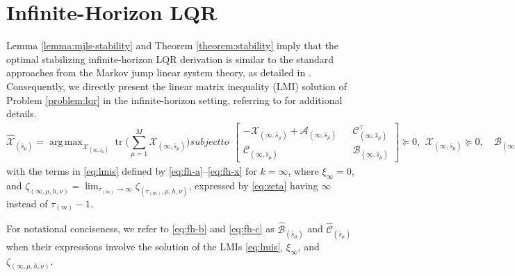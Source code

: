 \documentclass[journal,twoside,web]{ieeecolor}
\begin{document}
\section{Infinite-Horizon LQR}\label{sec:lqr-ih}
Lemma \ref{lemma:mjls-stability} and Theorem \ref{theorem:stability} imply that the optimal stabilizing infinite-horizon LQR derivation is similar to the standard approaches from the Markov jump linear system theory, as detailed in \cite{yZL-2025-automatica}. Consequently, we directly present the linear matrix inequality (LMI) solution of Problem \ref{problem:lqr} in the infinite-horizon setting, referring to \cite{yZL-2025-automatica} for additional details.
\begin{subequations}\label{eq:lmis}
\begin{equation}\label{eq:lmi-sol}
    \hat{\mathcal{X}}_{(\hat{s}_{\mu})} = \mathop{\mathrm{arg\,max}}_{\mathcal{X}_{(\infty,\hat{s}_{\mu})}} 
    \mathop{\mathrm{tr}}\bigg(\sum_{\mu=1}^{M}\mathcal{X}_{(\infty,\hat{s}_{\mu})}\bigg) 
\end{equation}
subject to
\begin{align}\label{eq:lmi-core}
    \begin{bmatrix}
        -\mathcal{X}_{(\infty,\hat{s}_{\mu})} + \mathcal{A}_{(\infty,\hat{s}_{\mu})} & & \mathcal{C}_{(\infty,\hat{s}_{\mu})}^{\top} \\
        \mathcal{C}_{(\infty,\hat{s}_{\mu})} & & \mathcal{B}_{(\infty,\hat{s}_{\mu})}
    \end{bmatrix} \succeq 0,
\end{align}
\begin{equation}\label{eq:lmi-supp}
    \mathcal{X}_{(\infty,\hat{s}_{\mu})}\succeq 0, \quad \mathcal{B}_{(\infty,\hat{s}_{\mu})} \succ 0, 
\end{equation}
\end{subequations}
with the terms in \eqref{eq:lmis} defined by \eqref{eq:fh-a}–\eqref{eq:fh-x} for $k=\infty$, where
$\xi_{\infty} = 0$, and $\zeta_{(\infty,\mu,h,\nu)}=\lim_{\tau_{(m)}\to\infty}\zeta_{(\tau_{(m)},\mu,h,\nu)}$, expressed by \eqref{eq:zeta} having $\infty$ instead of $\tau_{(m)}-1$.

For notational conciseness, we refer to \eqref{eq:fh-b} and \eqref{eq:fh-c} as $\hat{\mathcal{B}}_{(\hat{s}_{\mu})}$ and $\hat{\mathcal{C}}_{(\hat{s}_{\mu})}$ when their expressions involve the solution of the LMIs \eqref{eq:lmis}, $\xi_{\infty}$, and $\zeta_{(\infty,\mu,h,\nu)}$.
\end{document}

